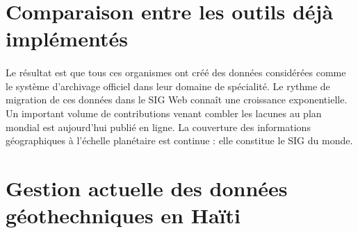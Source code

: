         \cite{Toll}
    \section{Comparaison entre les outils déjà implémentés}
    \paragraph{}
    Le résultat est que tous ces organismes ont créé des données considérées 
    comme le système d’archivage officiel dans leur domaine de spécialité. 
    Le rythme de migration de ces données dans le SIG Web connaît une 
    croissance exponentielle. Un important volume de contributions venant 
    combler les lacunes au plan mondial est aujourd’hui publié en ligne. 
    La couverture des informations géographiques à l’échelle planétaire est 
    continue : elle constitue le SIG du monde. \par 


    \lipsum[1]
    \section{Gestion actuelle des données géothechniques en Haïti}
    \lipsum[1]
